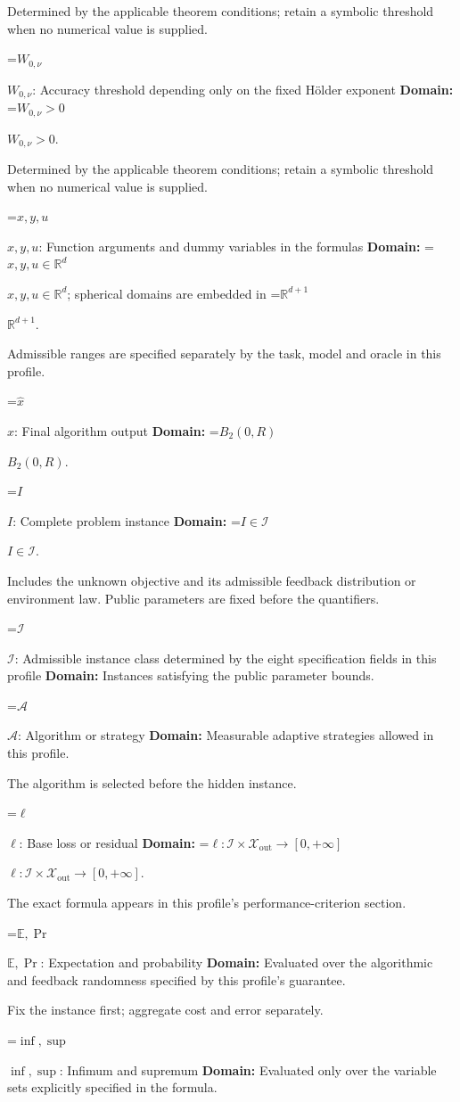 \documentclass[10pt,a4paper]{article}
\newcommand{\AtlasMath}[1]{\par\begingroup\centering\setbox0=\hbox{$\displaystyle #1$}\ifdim\wd0>1.4\linewidth\typeout{ATLAS WIDE FORMULA: \the\wd0}\fi\ifdim\wd0>\linewidth\resizebox{\linewidth}{!}{\box0}\else\box0\fi\par\endgroup}
\newcommand{\AtlasInlineMath}[1]{\begingroup\setbox0=\hbox{$#1$}\ifdim\wd0>.4\linewidth\endgroup\AtlasMath{#1}\else\endgroup$#1$\fi}
\begin{document}
Determined by the applicable theorem conditions; retain a symbolic threshold when no numerical value is supplied.

\AtlasInlineMath{W_{0,\nu}}: Accuracy threshold depending only on the fixed Hölder exponent \textbf{Domain:} \AtlasInlineMath{W_{0,\nu}>0}.

Determined by the applicable theorem conditions; retain a symbolic threshold when no numerical value is supplied.

\AtlasInlineMath{x,y,u}: Function arguments and dummy variables in the formulas \textbf{Domain:} \AtlasInlineMath{x,y,u\in\mathbb{R}^d}; spherical domains are embedded in \AtlasInlineMath{\mathbb{R}^{d+1}}.

Admissible ranges are specified separately by the task, model and oracle in this profile.

\AtlasInlineMath{\widehat{x}}: Final algorithm output \textbf{Domain:} \AtlasInlineMath{B_2(0,R)}.

\AtlasInlineMath{I}: Complete problem instance \textbf{Domain:} \AtlasInlineMath{I\in\mathcal{I}}.

Includes the unknown objective and its admissible feedback distribution or environment law. Public parameters are fixed before the quantifiers.

\AtlasInlineMath{\mathcal{I}}: Admissible instance class determined by the eight specification fields in this profile \textbf{Domain:} Instances satisfying the public parameter bounds.

\AtlasInlineMath{\mathcal{A}}: Algorithm or strategy \textbf{Domain:} Measurable adaptive strategies allowed in this profile.

The algorithm is selected before the hidden instance.

\AtlasInlineMath{\ell}: Base loss or residual \textbf{Domain:} \AtlasInlineMath{\ell:\mathcal{I}\times\mathcal{X}_{\mathrm{out}}\to[0,+\infty]}.

The exact formula appears in this profile's performance-criterion section.

\AtlasInlineMath{\mathbb{E},\Pr}: Expectation and probability \textbf{Domain:} Evaluated over the algorithmic and feedback randomness specified by this profile's guarantee.

Fix the instance first; aggregate cost and error separately.

\AtlasInlineMath{\inf,\sup}: Infimum and supremum \textbf{Domain:} Evaluated only over the variable sets explicitly specified in the formula.
\end{document}
